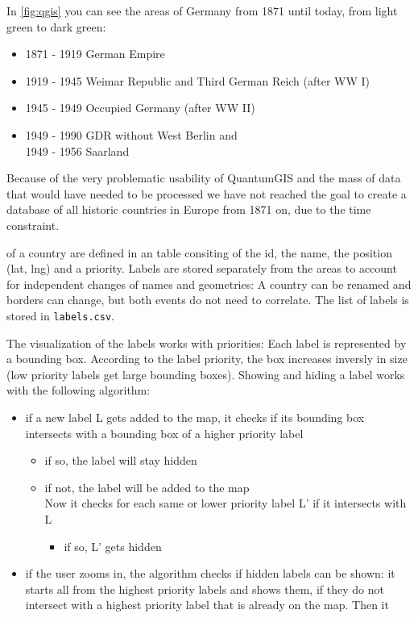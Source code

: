 In \ref{fig:qgis} you can see the areas of Germany from 1871 until today, from light green to dark green:

\begin{itemize}
  \item 1871 - 1919 German Empire
  \item 1919 - 1945 Weimar Republic and Third German Reich (after WW I)
  \item 1945 - 1949 Occupied Germany (after WW II)
  \item 1949 - 1990 GDR without West Berlin and \\
        1949 - 1956 Saarland
\end{itemize}

Because of the very problematic usability of QuantumGIS and the mass of data that would have needed to be processed we have not reached the goal to create a database of all historic countries in Europe from 1871 on, due to the time constraint.

of a country are defined in an table consiting of the id, the name, the position (lat, lng) and a priority. Labels are stored separately from the areas to account for independent changes of names and geometries: A country can be renamed and borders can change, but both events do not need to correlate. The list of labels is stored in \texttt{labels.csv}.

The visualization of the labels works with priorities: Each label is represented by a bounding box. According to the label priority, the box increases inversly in size (low priority labels get large bounding boxes). Showing and hiding a label works with the following algorithm:

\begin{itemize}
  \item if a new label L gets added to the map, it checks if its bounding box intersects with a bounding box of a higher priority label
  \begin{itemize}
    \item if so, the label will stay hidden
    \item if not, the label will be added to the map \\
    Now it checks for each same or lower priority label L' if it intersects with L
    \begin{itemize}
      \item if so, L' gets hidden
    \end{itemize}
  \end{itemize}
  \item if the user zooms in, the algorithm checks if hidden labels can be shown: it starts all from the highest priority labels and shows them, if they do not intersect with a highest priority label that is already on the map. Then it
\end{itemize}

